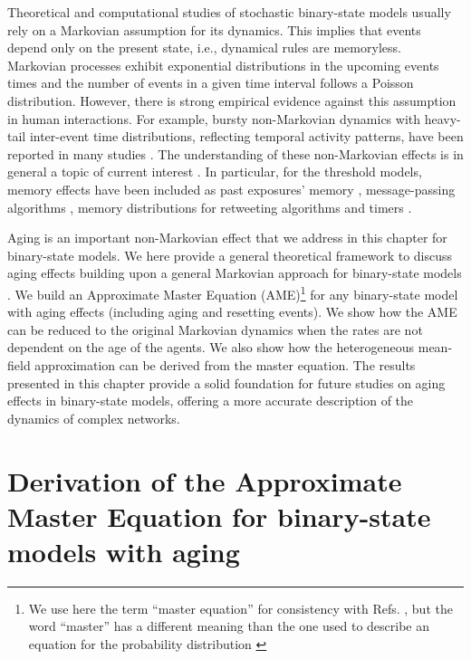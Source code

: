 Theoretical and computational studies of stochastic binary-state models usually rely on a Markovian assumption for its dynamics. This implies that events depend only on the present state, i.e., dynamical rules are memoryless. Markovian processes exhibit exponential distributions in the upcoming events times and the number of events in a given time interval follows a Poisson distribution. However, there is strong empirical evidence against this assumption in human interactions.  For example, bursty non-Markovian dynamics with heavy-tail inter-event time distributions, reflecting temporal activity patterns,  have been reported in many studies \cite{iribarren-2009,karsai-2011,rybski-2012,zignani-2016,artime-2017,kumar-2020}. The understanding of these non-Markovian effects is in general a topic of current interest \cite{van-mieghem-2013,starnini-2017,peralta-2020C,peralta-2020A}. In particular, for the threshold models, memory effects have been included as past exposures' memory \cite{dodds-2004}, message-passing algorithms \cite{shrestha-2014}, memory distributions for retweeting algorithms \cite{gleeson-2016} and timers \cite{oh-2018}.

Aging is an important non-Markovian effect that we address in this chapter for binary-state models. We here provide a general theoretical framework to discuss aging effects building upon a general Markovian approach for binary-state models \cite{gleeson-2011,gleeson-2013}. We build an Approximate Master Equation (AME)\footnote{We use here the term  ``master equation'' for consistency with  Refs. \cite{gleeson-2011,gleeson-2013}, but the word ``master'' has a different meaning than the one used to describe an equation for the probability distribution \cite{peralta-2020B}} for any binary-state model with aging effects (including aging and resetting events). We show how the AME can be reduced to the original Markovian dynamics when the rates are not dependent on the age of the agents. We also show how the heterogeneous mean-field approximation can be derived from the master equation. The results presented in this chapter provide a solid foundation for future studies on aging effects in binary-state models, offering a more accurate description of the dynamics of complex networks. 

\section{Derivation of the Approximate Master Equation for binary-state models with aging \label{sec:Derivation of the Approximate Master Equation for binary-state models with aging}}
    
